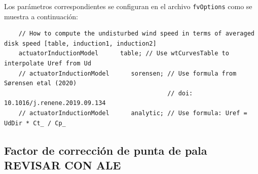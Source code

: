 Los parámetros correspondientes se configuran en el archivo \texttt{fvOptions} como se muestra a continuación:

\begin{scriptsize}
\begin{verbatim}
    // How to compute the undisturbed wind speed in terms of averaged disk speed [table, induction1, induction2]
    actuatorInductionModel      table; // Use wtCurvesTable to interpolate Uref from Ud
    // actuatorInductionModel      sorensen; // Use formula from Sørensen etal (2020) 
                                             // doi: 10.1016/j.renene.2019.09.134
    // actuatorInductionModel      analytic; // Use formula: Uref = UdDir * Ct_ / Cp_
\end{verbatim}
\end{scriptsize}

\subsection{Factor de corrección de punta de pala \Large REVISAR CON ALE}

